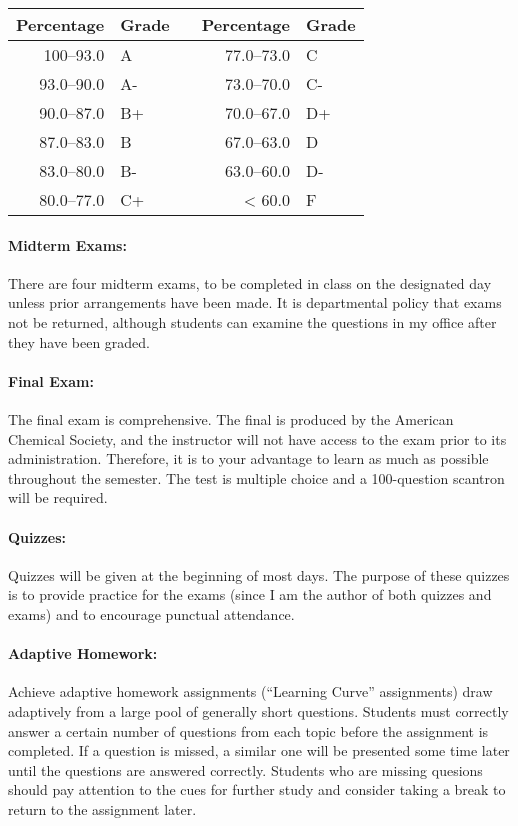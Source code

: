 \documentclass[12pt, letterpaper]{article}
\begin{document}
\begin{tabular}{rl|c|rl}
	Percentage & Grade &  & Percentage & Grade \\ \midrule
	100--93.0  & A     &  & 77.0--73.0 & C     \\
	93.0--90.0 & A-    &  & 73.0--70.0 & C-    \\
	90.0--87.0 & B+    &  & 70.0--67.0 & D+    \\
	87.0--83.0 & B     &  & 67.0--63.0 & D     \\
	83.0--80.0 & B-    &  & 63.0--60.0 & D-    \\
	80.0--77.0 & C+    &  & < 60.0     & F
\end{tabular}
\paragraph{Midterm Exams:}
There are four midterm exams, to be completed in class on the designated day unless prior arrangements have been made. It is departmental policy that exams not be returned, although students can examine the questions in my office after they have been graded.

\paragraph{Final Exam:}
The final exam is comprehensive. The final is produced by the American Chemical Society, and the instructor will not have access to the exam prior to its administration. Therefore, it is to your advantage to learn as much as possible throughout the semester. The test is multiple choice and a 100-question scantron will be required.

\paragraph{Quizzes:}
Quizzes will be given at the beginning of most days. The purpose of these quizzes is to provide practice for the exams (since I am the author of both quizzes and exams) and to encourage punctual attendance.

\paragraph{Adaptive Homework:}
Achieve adaptive homework assignments (``Learning Curve'' assignments) draw adaptively from a large pool of generally short questions. Students must correctly answer a certain number of questions from each topic before the assignment is completed. If a question is missed, a similar one will be presented some time later until the questions are answered correctly. Students who are missing quesions should pay attention to the cues for further study and consider taking a break to return to the assignment later.
\end{document}
